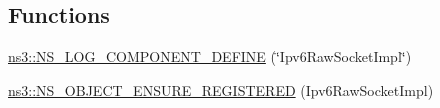 \subsection*{Functions}
\begin{DoxyCompactItemize}
\item 
\hyperlink{namespacens3_a144839feea0937e5943d09675456a256}{ns3\+::\+N\+S\+\_\+\+L\+O\+G\+\_\+\+C\+O\+M\+P\+O\+N\+E\+N\+T\+\_\+\+D\+E\+F\+I\+NE} (\char`\"{}Ipv6\+Raw\+Socket\+Impl\char`\"{})
\item 
\hyperlink{namespacens3_aaa8149717db785bc1fe96964941aac60}{ns3\+::\+N\+S\+\_\+\+O\+B\+J\+E\+C\+T\+\_\+\+E\+N\+S\+U\+R\+E\+\_\+\+R\+E\+G\+I\+S\+T\+E\+R\+ED} (Ipv6\+Raw\+Socket\+Impl)
\end{DoxyCompactItemize}
